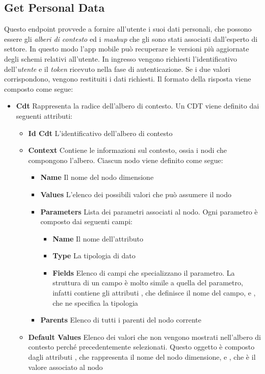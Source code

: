 \subsection{Get Personal Data\label{sec:get-personal-data-endpoint}}

Questo endpoint provvede a fornire all'utente i suoi dati personali, che possono essere gli \emph{alberi di contesto} ed i \emph{mashup} che gli sono stati associati dall'esperto di settore. In questo modo l'app mobile può recuperare le versioni più aggiornate degli schemi relativi all'utente. In ingresso vengono richiesti l'identificativo dell'\emph{utente} e il \emph{token} ricevuto nella fase di autenticazione. Se i due valori corrispondono, vengono restituiti i dati richiesti. Il formato della risposta viene composto come segue:

\begin{itemize}
	\item \textbf{Cdt} Rappresenta la radice dell'albero di contesto. Un CDT viene definito dai seguenti attributi:
	\begin{itemize}
		\item \textbf{Id Cdt} L'identificativo dell'albero di contesto
		\item \textbf{Context} Contiene le informazioni sul contesto, ossia i nodi che compongono l'albero. Ciascun nodo viene definito come segue:
		\begin{itemize}
			\item \textbf{Name} Il nome del nodo dimensione
			\item \textbf{Values} L'elenco dei possibili valori che può assumere il nodo
			\item \textbf{Parameters} Lista dei parametri associati al nodo. Ogni parametro è composto dai seguenti campi:
			\begin{itemize}
				\item \textbf{Name} Il nome dell'attributo
				\item \textbf{Type} La tipologia di dato
				\item \textbf{Fields} Elenco di campi che specializzano il parametro. La struttura di un campo è molto simile a quella del parametro, infatti contiene gli attributi , che definisce il nome del campo, e , che ne specifica la tipologia
			\end{itemize}
			\item \textbf{Parents} Elenco di tutti i parenti del nodo corrente
		\end{itemize}
		\item \textbf{Default Values} Elenco dei valori che non vengono mostrati nell'albero di contesto perché precedentemente selezionati. Questo oggetto è composto dagli attributi , che rappresenta il nome del nodo dimensione, e , che è il valore associato al nodo

\end{itemize}
\end{itemize}
